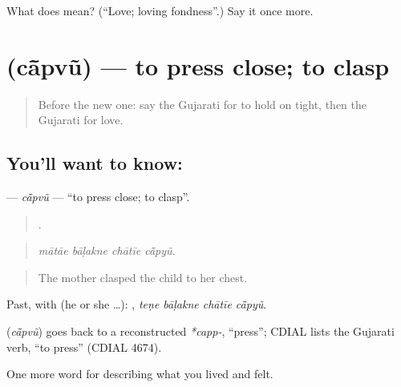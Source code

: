 \begin{tcolorbox}[breakable,colback=teal!4,colframe=teal!35!black,title={Before you move on}]
What does  mean? (\textquotedblleft{}Love; loving fondness\textquotedblright{}.) Say it once more.
\end{tcolorbox}
\section[\texorpdfstring{\gu{ચાંપવું} (cā̃pvũ)}{ચાંપવું (cā̃pvũ)}]{ (cā̃pvũ) — to press close; to clasp}

\label{lesson:GU-C451-capvu}



\begin{quote}
Before the new one: say the Gujarati for to hold on tight, then the Gujarati for love.
\end{quote}

\subsection*{You'll want to know: }
\textbf{} — \emph{cā̃pvũ} — \textquotedblleft{}to press close; to clasp\textquotedblright{}.

\begin{quote}
   .
\end{quote}

\begin{quote}
\emph{mātāe bāḷakne chātīe cā̃pyũ.}
\end{quote}

\begin{quote}
The mother clasped the child to her chest.
\end{quote}

Past, with  (he or she …):    , \emph{teṇe bāḷakne chātīe cā̃pyũ}.

\begin{cousinweb}
\textbf{} (\emph{cā̃pvũ}) goes back to a reconstructed \emph{*capp-}, \textquotedblleft{}press\textquotedblright{}; CDIAL lists the Gujarati verb, \textquotedblleft{}to press\textquotedblright{} (CDIAL 4674).
\end{cousinweb}

\begin{grammarlens}[title={What you've built}]
One more word for describing what you lived and felt.
\end{grammarlens}


